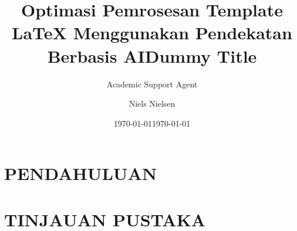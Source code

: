 \documentclass{article}
\title{Optimasi Pemrosesan Template LaTeX Menggunakan Pendekatan Berbasis AI}
\author{Academic Support Agent}
\date{\today}
\begin{document}
\maketitle

\begin{abstract}

\end{abstract}

\chapter{PENDAHULUAN}


\chapter{TINJAUAN PUSTAKA}



\usepackage[english]{babel}
\usepackage[utf8]{inputenc}
\usepackage{amsmath}
\usepackage{graphicx}
\usepackage[colorinlistoftodos]{todonotes}

\title{Dummy Title}

\author{Niels Nielsen}

\date{\today}
\end{document}
